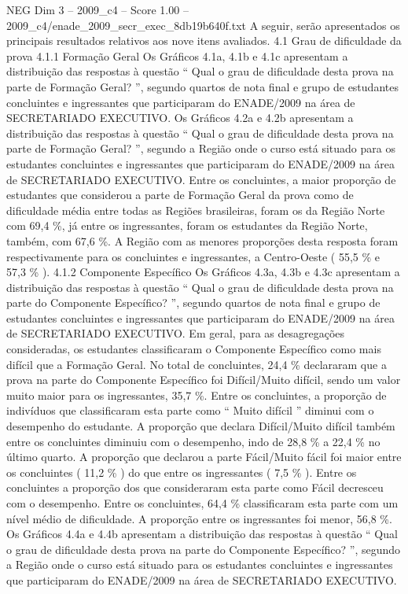 \begin{textsample}{NEG Dim 3 – 2009\_c4 – Score 1.00 – 2009\_c4/enade\_2009\_secr\_exec\_8db19b640f.txt}
A seguir, serão apresentados os principais resultados relativos aos nove itens avaliados. 4.1 Grau de dificuldade da prova 4.1.1 Formação Geral Os Gráficos 4.1a, 4.1b e 4.1c apresentam a distribuição das respostas à questão “ Qual o grau de dificuldade desta prova na parte de Formação Geral? ”, segundo quartos de nota final e grupo de estudantes concluintes e ingressantes que participaram do ENADE/2009 na área de SECRETARIADO EXECUTIVO.
Os Gráficos 4.2a e 4.2b apresentam a distribuição das respostas à questão “ Qual o grau de dificuldade desta prova na parte de Formação Geral? ”, segundo a Região onde o curso está situado para os estudantes concluintes e ingressantes que participaram do ENADE/2009 na área de SECRETARIADO EXECUTIVO.
Entre os concluintes, a maior proporção de estudantes que considerou a parte de Formação Geral da prova como de dificuldade média entre todas as Regiões brasileiras, foram os da Região Norte com 69,4 \%, já entre os ingressantes, foram os estudantes da Região Norte, também, com 67,6 \%.
A Região com as menores proporções desta resposta foram respectivamente para os concluintes e ingressantes, a Centro-Oeste ( 55,5 \% e 57,3 \% ). 4.1.2 Componente Específico Os Gráficos 4.3a, 4.3b e 4.3c apresentam a distribuição das respostas à questão “ Qual o grau de dificuldade desta prova na parte do Componente Específico? ”, segundo quartos de nota final e grupo de estudantes concluintes e ingressantes que participaram do ENADE/2009 na área de SECRETARIADO EXECUTIVO.
Em geral, para as desagregações consideradas, os estudantes classificaram o Componente Específico como mais difícil que a Formação Geral.
No total de concluintes, 24,4 \% declararam que a prova na parte do Componente Específico foi Difícil/Muito difícil, sendo um valor muito maior para os ingressantes, 35,7 \%.
Entre os concluintes, a proporção de indivíduos que classificaram esta parte como “ Muito difícil ” diminui com o desempenho do estudante.
A proporção que declara Difícil/Muito difícil também entre os concluintes diminuiu com o desempenho, indo de 28,8 \% a 22,4 \% no último quarto.
A proporção que declarou a parte Fácil/Muito fácil foi maior entre os concluintes ( 11,2 \% ) do que entre os ingressantes ( 7,5 \% ).
Entre os concluintes a proporção dos que consideraram esta parte como Fácil decresceu com o desempenho.
Entre os concluintes, 64,4 \% classificaram esta parte com um nível médio de dificuldade.
A proporção entre os ingressantes foi menor, 56,8 \%.
Os Gráficos 4.4a e 4.4b apresentam a distribuição das respostas à questão “ Qual o grau de dificuldade desta prova na parte do Componente Específico? ”, segundo a Região onde o curso está situado para os estudantes concluintes e ingressantes que participaram do ENADE/2009 na área de SECRETARIADO EXECUTIVO.

\end{textsample}
